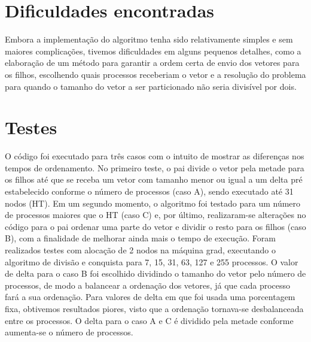 \documentclass{article}
\begin{document}
\begin{multicols*}{2}
\section{Dificuldades encontradas}
Embora a implementação do algoritmo tenha sido relativamente simples e sem maiores complicações, tivemos dificuldades em alguns pequenos detalhes, como a elaboração de um método para garantir a ordem certa de envio dos vetores para os filhos, escolhendo quais processos receberiam o vetor e a resolução do problema para quando o tamanho do vetor a ser particionado não seria divisível por dois.
\section{Testes}
 O código foi executado para três casos com o intuito de mostrar as diferenças nos tempos de ordenamento. No primeiro teste, o pai divide o vetor pela metade para os filhos até que se receba um vetor com tamanho menor ou igual a um delta pré estabelecido conforme o número de processos (caso A), sendo executado até 31 nodos (HT). Em um segundo momento, o algoritmo foi testado para um número de processos maiores que o HT (caso C) e, por último, realizaram-se alterações no código para o pai ordenar uma parte do vetor e dividir o resto para os filhos (caso B), com a finalidade de melhorar ainda mais o tempo de execução. Foram realizados testes com alocação de 2 nodos na máquina grad, executando o algoritmo de divisão e conquista para 7, 15, 31, 63, 127 e 255 processos. O valor de delta para o caso B foi escolhido dividindo o tamanho do vetor pelo número de processos, de modo a balancear a ordenação dos vetores, já que cada processo fará a sua ordenação. Para valores de delta em que foi usada uma porcentagem fixa, obtivemos resultados piores, visto que a ordenação tornava-se desbalanceada entre os processos. O delta para o caso A e C é dividido pela metade conforme aumenta-se o número de processos.

\end{multicols*}
\end{document}
